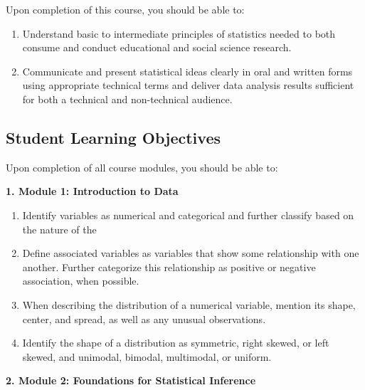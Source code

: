 \documentclass[
]{article}
\providecommand{\tightlist}{%
  \setlength{\itemsep}{0pt}\setlength{\parskip}{0pt}}
\begin{document}
Upon completion of this course, you should be able to:

\begin{enumerate}
\def\labelenumi{\arabic{enumi}.}
\tightlist
\item
  Understand basic to intermediate principles of statistics needed to
  both consume and conduct educational and social science research.
\item
  Communicate and present statistical ideas clearly in oral and written
  forms using appropriate technical terms and deliver data analysis
  results sufficient for both a technical and non-technical audience.
\end{enumerate}

\subsection{Student Learning Objectives}

Upon completion of all course modules, you should be able to:

\textbf{1. Module 1: Introduction to Data}

\begin{enumerate}
\def\labelenumi{\arabic{enumi}.}
\tightlist
\item
  Identify variables as numerical and categorical and further classify
  based on the nature of the
\item
  Define associated variables as variables that show some relationship
  with one another. Further categorize this relationship as positive or
  negative association, when possible.
\item
  When describing the distribution of a numerical variable, mention its
  shape, center, and spread, as well as any unusual observations.
\item
  Identify the shape of a distribution as symmetric, right skewed, or
  left skewed, and unimodal, bimodal, multimodal, or uniform.
\end{enumerate}

\textbf{2. Module 2: Foundations for Statistical Inference}
\end{document}
